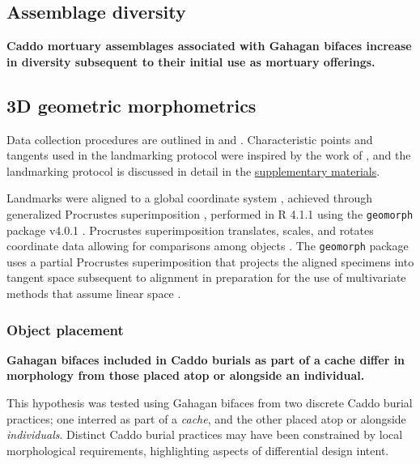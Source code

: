\documentclass[]{interact}
\theoremstyle{plain}%
\theoremstyle{definition}
\theoremstyle{remark}
\begin{document}
\hypertarget{assemblage-diversity}{%
\subsection{Assemblage diversity}\label{assemblage-diversity}}

\textbf{Caddo mortuary assemblages associated with Gahagan bifaces
increase in diversity subsequent to their initial use as mortuary
offerings.}

\hypertarget{d-geometric-morphometrics}{%
\subsection{3D geometric
morphometrics}\label{d-geometric-morphometrics}}

Data collection procedures are outlined in \cite{RN8154} and
\cite{RN8318}. Characteristic points and tangents used in the
landmarking protocol were inspired by the work of \cite{RN5700}, and the
landmarking protocol is discussed in detail in the
\href{https://seldenlab.github.io/gahaganmorph.3/}{supplementary
materials}.

Landmarks were aligned to a global coordinate system
\citep{RN8102,RN8587,RN8384}, achieved through generalized Procrustes
superimposition \citep{RN8525}, performed in R 4.1.1 \citep{RN8584}
using the \texttt{geomorph} package v4.0.1 \citep{RN8565,RN9565}.
Procrustes superimposition translates, scales, and rotates coordinate
data allowing for comparisons among objects \citep{RN5698,RN8525}. The
\texttt{geomorph} package uses a partial Procrustes superimposition that
projects the aligned specimens into tangent space subsequent to
alignment in preparation for the use of multivariate methods that assume
linear space \citep{RN8511,RN8384}.

\hypertarget{object-placement}{%
\subsubsection{Object placement}\label{object-placement}}

\textbf{Gahagan bifaces included in Caddo burials as part of a cache
differ in morphology from those placed atop or alongside an individual.}

This hypothesis was tested using Gahagan bifaces from two discrete Caddo
burial practices; one interred as part of a \emph{cache}, and the other
placed atop or alongside \emph{individuals}. Distinct Caddo burial
practices may have been constrained by local morphological requirements,
highlighting aspects of differential design intent.
\end{document}
